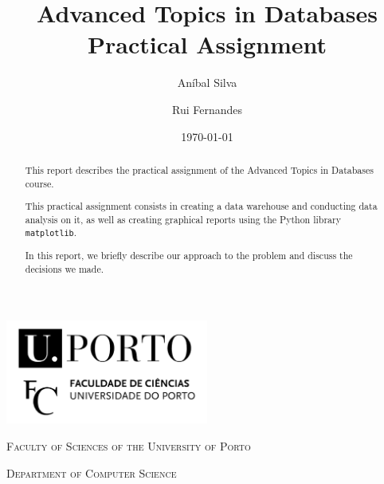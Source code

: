 \documentclass[a4paper, 11pt]{article}
\title{Advanced Topics in Databases \\ [0.8em] \smaller Practical Assignment}
\author{Aníbal Silva \and Rui Fernandes}
\date{\today}
\begin{document}
\renewcommand\labelitemi{--}
\renewcommand{\today}{\ifcase \month\or January\or February\or March\or %
April\or May\or June\or July\or August\or September\or October\or November\or %
December\fi, \number \year}

\begin{titlepage}
    \begin{center}
        \begin{minipage}{.75\linewidth}
            \centering
            \includegraphics[width=0.5\textwidth]{img/fcup}\par\vspace{1cm}
            \vspace{1.5cm}
            {\scshape\LARGE Faculty of Sciences of the University of Porto} \par
            \vspace{1cm}
            {\scshape\Large Department of Computer Science} \par
            \vspace{1.5cm}
            \maketitle
        \end{minipage}
    \end{center}
    \vspace{2cm}
    \thispagestyle{empty}
    \pagebreak
\end{titlepage}

\pagebreak


\begin{abstract}
This report describes the practical assignment of the Advanced Topics in Databases course. 

This practical assignment consists in creating a data warehouse and conducting data analysis on it, as well as creating
graphical reports using the Python library \texttt{matplotlib}.

In this report, we briefly describe our approach to the problem and discuss the decisions we made.
\end{abstract}
\end{document}
